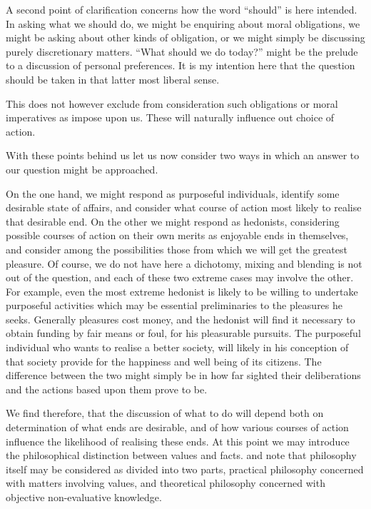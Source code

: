 A second point of clarification concerns how the word ``should'' is here intended.
In asking what we should do, we might be enquiring about moral obligations, we might be asking about other kinds of obligation, or we might simply be discussing purely discretionary matters.
``What should we do today?'' might be the prelude to a discussion of personal preferences.
It is my intention here that the question should be taken in that latter most liberal sense.

This does not however exclude from consideration such obligations or moral imperatives as impose upon us.
These will naturally influence out choice of action.

With these points behind us let us now consider two ways in which an answer to our question might be approached.

On the one hand, we might respond as purposeful individuals, identify some desirable state of affairs, and consider what course of action most likely to realise that desirable end.
On the other we might respond as hedonists, considering possible courses of action on their own merits as enjoyable ends in themselves, and consider among the possibilities those from which we will get the greatest pleasure.
Of course, we do not have here a dichotomy, mixing and blending is not out of the question, and each of these two extreme cases may involve the other.
For example, even the most extreme hedonist is likely to be willing to undertake purposeful activities which may be essential preliminaries to the pleasures he seeks.
Generally pleasures cost money, and the hedonist will find it necessary to obtain funding by fair means or foul, for his pleasurable pursuits.
The purposeful individual who wants to realise a better society, will likely in his conception of that society provide for the happiness and well being of its citizens.
The difference between the two might simply be in how far sighted their deliberations and the actions based upon them prove to be.

We find therefore, that the discussion of what to do will depend both on determination of what ends are desirable, and of how various courses of action influence the likelihood of realising these ends.
At this point we may introduce the philosophical distinction between values and facts. and note that philosophy itself may be considered as divided into two parts, practical philosophy concerned with matters involving values, and theoretical philosophy concerned with objective non-evaluative knowledge.

